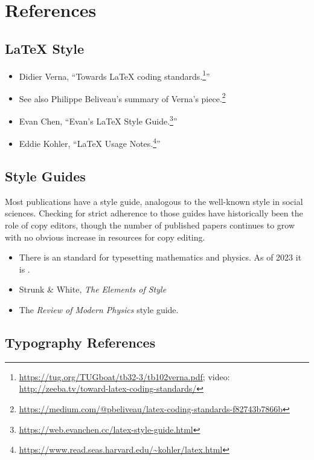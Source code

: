
\section{References}

\subsection{\texorpdfstring{\LaTeX{} Style}{LaTeX Style}}

\begin{itemize}
    \item Didier Verna, ``Towards \LaTeX{} coding standards.\footnote{\url{https://tug.org/TUGboat/tb32-3/tb102verna.pdf}; video: \url{http://zeeba.tv/toward-latex-coding-standards/}}'' 
    \item See also Philippe Beliveau's summary of Verna's piece.\footnote{\url{https://medium.com/@pbeliveau/latex-coding-standards-f82743b7866b}}
    \item Evan Chen, ``Evan's \LaTeX{} Style Guide.\footnote{\url{https://web.evanchen.cc/latex-style-guide.html}}''
    \item Eddie Kohler, ``LaTeX Usage Notes.\footnote{\url{https://www.read.seas.harvard.edu/~kohler/latex.html}}''
\end{itemize}


\subsection{Style Guides}

Most publications have a style guide, analogous to the well-known  style in social sciences. Checking for strict adherence to those guides have historically been the role of copy editors, though the number of published papers continues to grow with no obvious increase in resources for copy editing. 

\begin{itemize}
    \item There is an  standard for typesetting mathematics and physics. As of 2023 it is .
    \item Strunk \& White, \emph{The Elements of Style}
    \item The \emph{Review of Modern Physics} style guide. 
\end{itemize}

\subsection{Typography References}

